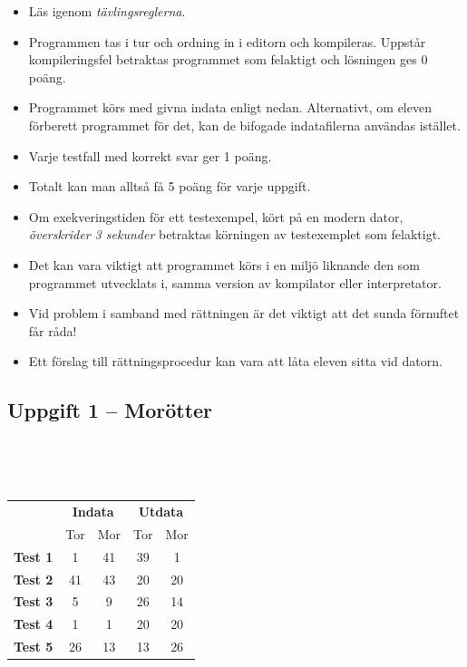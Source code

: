 \documentclass[a4paper,12pt,oneside]{amsbook}
\theoremstyle{test}
\newcommand{\fe}[1]{\textbf{#1}}            %
\begin{document}


\thispagestyle{fancy}
\lhead{}
\begin{itemize}
\item Läs igenom \textit{tävlingsreglerna}.
\item Programmen tas i tur och ordning in i editorn och kompileras.
Uppstår kompileringsfel betraktas programmet som felaktigt och lösningen
ges $0$ poäng.
\item Programmet körs med givna indata enligt nedan. Alternativt, om eleven förberett programmet för det, kan de bifogade indatafilerna användas istället.
\item Varje testfall
  med korrekt svar ger 1 poäng.
\item
Totalt kan man
  alltså få 5 poäng för varje uppgift.
\item Om exekveringstiden för ett testexempel, kört på en modern dator,
\textit{överskrider 3 sekunder} betraktas körningen av testexemplet som felaktigt.
\item Det kan vara viktigt att programmet körs i en miljö liknande den som
programmet utvecklats i, samma version av kompilator eller
interpretator.
\item Vid problem i samband med rättningen är det viktigt att det sunda
förnuftet får råda!
\item Ett förslag till rättningsprocedur kan vara att låta eleven
sitta vid datorn.
\end{itemize}

\vspace{2cm}

\subsection*{Uppgift 1 -- Morötter}
~\\
{\tt 
\begin{tabular}{||l||c|c||c|c||}\hline\hline
& \multicolumn{2}{c||}{\fe{Indata}} & \multicolumn{2}{c||}{\fe{Utdata}} \\ 
& Tor & Mor & Tor & Mor \\ \hline \hline
\fe{Test 1} & 1 &41&39 &1\\ \hline
\fe{Test 2} & 41 &43&20 &20\\ \hline
\fe{Test 3} & 5 &9&26 &14\\ \hline
\fe{Test 4} & 1 &1&20 &20\\ \hline
\fe{Test 5} & 26 &13&13 &26\\ \hline\hline
\end{tabular}
}
\vspace{1cm}
\end{document}
